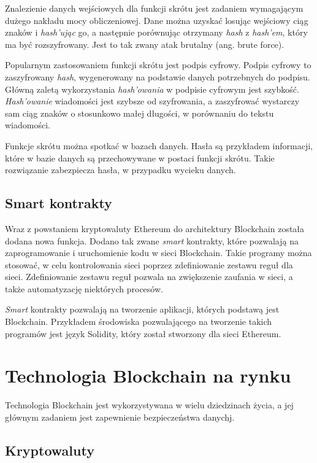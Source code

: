 \documentclass[a4paper,12pt]{book}
\begin{document}
Znalezienie danych wejściowych dla funkcji skrótu jest zadaniem wymagającym dużego nakładu mocy obliczeniowej. Dane można uzyskać losując wejściowy ciąg znaków i \textit{hash'ując} go, a następnie porównując otrzymany \textit{hash} z \textit{hash'em}, który ma być rozszyfrowany. Jest to tak zwany atak brutalny (ang. brute force).

Popularnym zastosowaniem funkcji skrótu jest podpis cyfrowy. Podpis cyfrowy to zaszyfrowany \textit{hash}, wygenerowany na podstawie danych potrzebnych do podpisu. Główną zaletą wykorzystania \textit{hash'owania} w podpisie cyfrowym jest szybkość. \textit{Hash'owanie} wiadomości jest szybsze od szyfrowania, a zaszyfrować wystarczy sam ciąg znaków o stosunkowo małej długości, w porównaniu do tekstu wiadomości.

Funkcje skrótu można spotkać w bazach danych. Hasła są przykładem informacji, które w bazie danych są przechowywane w postaci funkcji skrótu. Takie rozwiązanie zabezpiecza hasła, w przypadku wycieku danych. \cite{hash}

\subsection{Smart kontrakty}

Wraz z powstaniem kryptowaluty Ethereum do architektury Blockchain została dodana nowa funkcja. Dodano tak zwane \textit{smart} kontrakty, które pozwalają na zaprogramowanie i uruchomienie kodu w sieci Blockchain. Takie programy można stosować, w celu kontrolowania sieci poprzez zdefiniowanie zestawu reguł dla sieci. Zdefiniowanie zestawu reguł pozwala na zwiększenie zaufania w sieci, a także automatyzację niektórych procesów.

\textit{Smart} kontrakty pozwalają na tworzenie aplikacji, których podstawą jest Blockchain. Przykładem środowiska pozwalającego na tworzenie takich programów jest język Solidity, który został stworzony dla sieci Ethereum\cite{smart-contract}. 

\newpage

\section{Technologia Blockchain na rynku}

Technologia Blockchain jest wykorzystywana w wielu dziedzinach życia, a jej głównym zadaniem jest zapewnienie bezpieczeństwa danychj. 

\subsection{Kryptowaluty}
\end{document}
